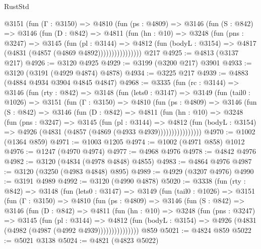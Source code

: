 \begin{lexlean}{RustStd}
\begin{coremodule}
            @3151
              (fun (Γ : @3150) =>
              @4810
                (fun (ps : @4809) =>
                @3146
                  (fun (S : @842) =>
                  @3146
                    (fun (D : @842) =>
                    @4811
                      (fun (hn : @10) =>
                      @3248
                        (fun (pns : @3247) =>
                        @3145
                          (fun (pl : @3144) =>
                          @4812
                            (fun (bodyL : @3154) => @4817 (@4831 (@4857 (@4869 @4892))))))))))))))))
    @217
@4925 := @4813 (@3137 @217)
@4926 := @3120 @4925
@4929 := @3199 (@3200 @217) @3901
@4933 := @3120 (@3191 (@4929 @4874) @4878)
@4934 := @3225 @217
@4939 := @4883 (@4884 @4934 @3904 @4845 @4847)
@4968 := @3335
    (fun (rc : @3144) =>
    @3146
      (fun (rty : @842) =>
      @3148
        (fun (lets0 : @3147) =>
        @3149
          (fun (tail0 : @1026) =>
          @3151
            (fun (Γ : @3150) =>
            @4810
              (fun (ps : @4809) =>
              @3146
                (fun (S : @842) =>
                @3146
                  (fun (D : @842) =>
                  @4811
                    (fun (hn : @10) =>
                    @3248
                      (fun (pns : @3247) =>
                      @3145
                        (fun (pl : @3144) =>
                        @4812
                          (fun (bodyL : @3154) =>
                          @4926 (@4831 (@4857 (@4869 (@4933 @4939))))))))))))))))
@4970 := @1002 (@1364 @859)
@4971 := @1003 @1205
@4974 := @1002 (@4971 @858) @1012
@4976 := @1247 (@4970 @4974)
@4977 := @4968 @4976
@4978 := @4842 @4976
@4982 := @3120 (@4834 (@4978 @4848) @4855)
@4983 := @4864 @4976
@4987 := @3120 (@3250 (@4983 @4848) @895)
@4989 := @4929 (@3207 @4976)
@4990 := @3191 @4989
@4992 := @3120 (@4990 @4878)
@5020 := @3338
    (fun (rty : @842) =>
    @3148
      (fun (lets0 : @3147) =>
      @3149
        (fun (tail0 : @1026) =>
        @3151
          (fun (Γ : @3150) =>
          @4810
            (fun (ps : @4809) =>
            @3146
              (fun (S : @842) =>
              @3146
                (fun (D : @842) =>
                @4811
                  (fun (hn : @10) =>
                  @3248
                    (fun (pns : @3247) =>
                    @3145
                      (fun (pl : @3144) =>
                      @4812
                        (fun (bodyL : @3154) =>
                        @4926 (@4831 (@4982 (@4987 (@4992 @4939)))))))))))))))
    @859
@5021 := @4824 @859
@5022 := @5021 @3138
@5024 := @4821 (@4823 @5022)

\end{coremodule}
\end{lexlean}
